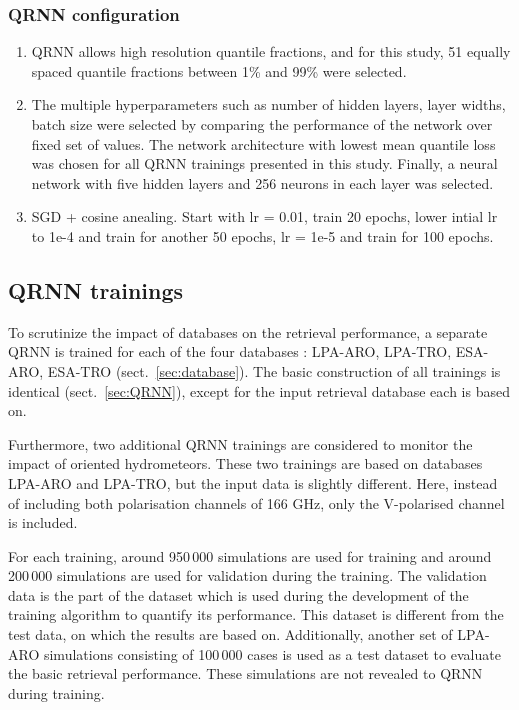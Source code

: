 \documentclass[amt, manuscript]{copernicus}
\newcommand{\todo}[1]{{\color{red} #1}}
\begin{document}
\subsubsection{QRNN configuration}

	\begin{enumerate}	
		
	\item QRNN allows high resolution quantile fractions, and for this study, 51 equally spaced quantile fractions between 1\% and 99\% were selected. 	
	
	\item The multiple hyperparameters such as number of hidden layers, layer widths, batch size were selected by comparing the performance of the network over fixed set of values. The network architecture with lowest mean quantile loss was chosen for all QRNN trainings presented in this study. Finally, a neural network
	with five hidden layers and 256 neurons in each layer was selected. 
	
	\item \todo {SGD + cosine anealing. Start with lr = 0.01, train 20 epochs,  lower intial lr to 1e-4 and train for another 50 epochs, lr = 1e-5 and train for 100 epochs.}	
	
  
\end{enumerate}

 
\subsection{QRNN trainings}

To scrutinize the impact of databases on the retrieval performance, a separate QRNN is trained for each of the four databases : LPA-ARO, LPA-TRO, ESA-ARO, ESA-TRO (sect.~\ref{sec:database}). The basic construction of all trainings is identical (sect.~\ref{sec:QRNN}), except for the input retrieval database each is based on. 

Furthermore, two additional QRNN trainings are considered to monitor the impact of oriented hydrometeors. These two trainings are based on databases LPA-ARO and LPA-TRO, but the input data is slightly different. Here, instead of including both polarisation channels of 166\,\,GHz, only the V-polarised channel is included.

For each training, around 950\,000  simulations are used for training and around 200\,000 simulations are used for validation during the training. The validation data is the part of the dataset which is used during the development of the training algorithm to quantify its performance. This dataset is different from the test data, on which the results are based on. Additionally, another set of LPA-ARO simulations consisting of 100\,000 cases is used as a test dataset to evaluate the  basic retrieval performance. These simulations are not revealed to QRNN during training. 
\end{document}
